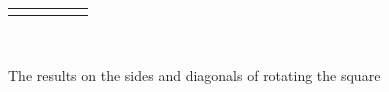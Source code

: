\documentclass[10pt,]{book}
\theoremstyle{plain}
\theoremstyle{definition}
\theoremstyle{definition}
\numberwithin{equation}{chapter}
\newlength{\panelmax}
\begin{document}
\begin{figure}
{\begin{lrbox}{\panelboxEimage}
{{}
}\end{lrbox}
\ifdefined\phEimage\else\newlength{\phEimage}\fi%
\setlength{\phEimage}{\ht\panelboxEimage+\dp\panelboxEimage}
\settototalheight{\phEimage}{\usebox{\panelboxEimage}}
\setlength{\panelmax}{\maxof{\panelmax}{\phEimage}}
\leavevmode%
\setlength{\tabcolsep}{0.005\linewidth}
\par\medskip\noindent
\hspace*{0.005\linewidth}%
\begin{tabular}{@{}*{5}{c}@{}}
\begin{minipage}[c][\panelmax][t]{0.19\linewidth}\usebox{\panelboxAimage}\end{minipage}&
\begin{minipage}[c][\panelmax][t]{0.19\linewidth}\usebox{\panelboxBimage}\end{minipage}&
\begin{minipage}[c][\panelmax][t]{0.19\linewidth}\usebox{\panelboxCimage}\end{minipage}&
\begin{minipage}[c][\panelmax][t]{0.19\linewidth}\usebox{\panelboxDimage}\end{minipage}&
\begin{minipage}[c][\panelmax][t]{0.19\linewidth}\usebox{\panelboxEimage}\end{minipage}\end{tabular}\\
}%
\caption{The results on the sides and diagonals of rotating the square\label{rotate-square}}
\end{figure}
\end{document}
